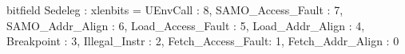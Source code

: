 bitfield Sedeleg : xlenbits = {
  UEnvCall          : 8,
  SAMO_Access_Fault : 7,
  SAMO_Addr_Align   : 6,
  Load_Access_Fault : 5,
  Load_Addr_Align   : 4,
  Breakpoint        : 3,
  Illegal_Instr     : 2,
  Fetch_Access_Fault: 1,
  Fetch_Addr_Align  : 0
}

